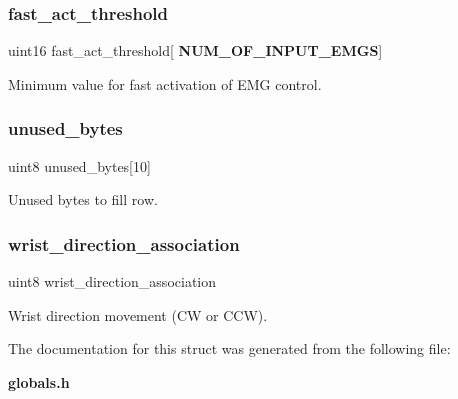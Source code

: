 \subsubsection{fast\+\_\+act\+\_\+threshold}
{\footnotesize\ttfamily uint16 fast\+\_\+act\+\_\+threshold[\textbf{ N\+U\+M\+\_\+\+O\+F\+\_\+\+I\+N\+P\+U\+T\+\_\+\+E\+M\+GS}]}

Minimum value for fast activation of E\+MG control. \mbox{\label{structst___w_r__spec_a5b2aa9b9e3a30600b63a4a7b09726901}} 
\subsubsection{unused\+\_\+bytes}
{\footnotesize\ttfamily uint8 unused\+\_\+bytes[10]}

Unused bytes to fill row. \mbox{\label{structst___w_r__spec_ac38ecf3efe59532bf516a7e1e36cd41b}} 
\subsubsection{wrist\+\_\+direction\+\_\+association}
{\footnotesize\ttfamily uint8 wrist\+\_\+direction\+\_\+association}

Wrist direction movement (CW or C\+CW). 

The documentation for this struct was generated from the following file\+:\begin{DoxyCompactItemize}
\item 
\textbf{ globals.\+h}\end{DoxyCompactItemize}
